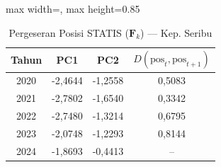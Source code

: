 \begin{table}[H]
\centering
\caption{Pergeseran Posisi STATIS ($\mathbf{F}_k$) --- Kep. Seribu} \label{tab:app2jarak_statis_skor_kep_seribu}
\begin{adjustbox}{max width=\textwidth, max height=0.85\textheight}
\begin{tabular}{|c|c|c|c|}
\hline
\textbf{Tahun} & \textbf{PC1} & \textbf{PC2} & \textbf{$D(\text{pos}_t, \text{pos}_{t+1})$} \\
\hline
2020 & -2,4644 & -1,2558 & 0,5083 \\
2021 & -2,7802 & -1,6540 & 0,3342 \\
2022 & -2,7480 & -1,3214 & 0,6795 \\
2023 & -2,0748 & -1,2293 & 0,8144 \\
2024 & -1,8693 & -0,4413 & -- \\
\hline
\end{tabular}
\end{adjustbox}
\end{table}